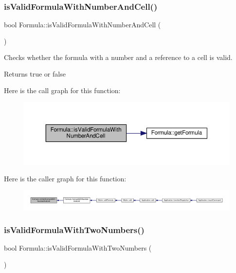 \subsubsection{\texorpdfstring{is\+Valid\+Formula\+With\+Number\+And\+Cell()}{isValidFormulaWithNumberAndCell()}}
{\footnotesize\ttfamily bool Formula\+::is\+Valid\+Formula\+With\+Number\+And\+Cell (\begin{DoxyParamCaption}{ }\end{DoxyParamCaption})\hspace{0.3cm}{\ttfamily [private]}}

Checks whether the formula with a number and a reference to a cell is valid. \begin{DoxyReturn}{Returns}
true or false 
\end{DoxyReturn}
Here is the call graph for this function\+:\nopagebreak
\begin{figure}[H]
\begin{center}
\leavevmode
\includegraphics[width=350pt]{class_formula_a83eff8c83a0ea79b3dd21c2e86a546c8_cgraph}
\end{center}
\end{figure}
Here is the caller graph for this function\+:\nopagebreak
\begin{figure}[H]
\begin{center}
\leavevmode
\includegraphics[width=350pt]{class_formula_a83eff8c83a0ea79b3dd21c2e86a546c8_icgraph}
\end{center}
\end{figure}
\mbox{\label{class_formula_a0a2b13b0f741ea650e1ae71269dde9a5}} 
\subsubsection{\texorpdfstring{is\+Valid\+Formula\+With\+Two\+Numbers()}{isValidFormulaWithTwoNumbers()}}
{\footnotesize\ttfamily bool Formula\+::is\+Valid\+Formula\+With\+Two\+Numbers (\begin{DoxyParamCaption}{ }\end{DoxyParamCaption})\hspace{0.3cm}{\ttfamily [private]}}

